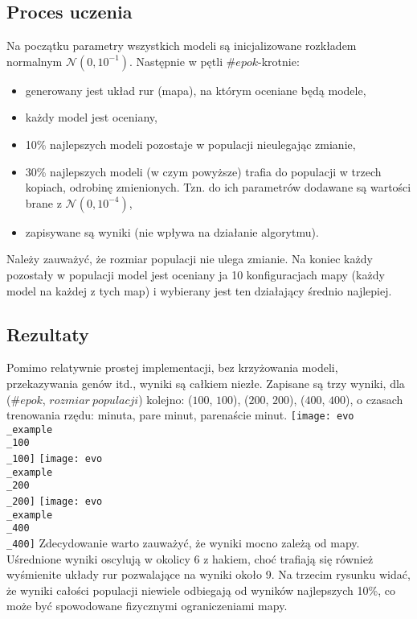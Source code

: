 \documentclass[12pt, A4]{article}
\begin{document}
\begin{itemize}
\begin{itemize}
\subsection{Proces uczenia}
Na początku parametry wszystkich modeli są inicjalizowane rozkładem normalnym $\mathcal{N}(0, 10^{-1})$.
Następnie w pętli $\#epok$-krotnie:
\begin{itemize}
	\item generowany jest układ rur (mapa), na którym oceniane będą modele,
	\item każdy model jest oceniany,
	\item 10\% najlepszych modeli pozostaje w populacji nieulegając zmianie,
	\item 30\% najlepszych modeli (w czym powyższe) trafia do populacji w trzech kopiach, odrobinę zmienionych. Tzn. do ich parametrów dodawane są wartości brane z $\mathcal{N}(0, 10^{-4})$,
	\item zapisywane są wyniki (nie wpływa na działanie algorytmu).
\end{itemize}
Należy zauważyć, że rozmiar populacji nie ulega zmianie.
\newline
Na koniec każdy pozostały w populacji model jest oceniany ja 10 konfiguracjach mapy (każdy model na każdej z tych map) i wybierany jest ten działający średnio najlepiej.

\subsection{Rezultaty}
Pomimo relatywnie prostej implementacji, bez krzyżowania modeli, przekazywania genów itd., wyniki są całkiem niezłe. Zapisane są trzy wyniki, dla ($\#epok$, $rozmiar \ populacji$) kolejno: ($100$, $100$), ($200$, $200$), ($400$, $400$), o czasach trenowania rzędu: minuta, pare minut, parenaście minut.
\newline
\texttt{[image: evo\\\_example\\\_100\\\_100]}
\texttt{[image: evo\\\_example\\\_200\\\_200]}
\newline
\texttt{[image: evo\\\_example\\\_400\\\_400]}
\newline
Zdecydowanie warto zauważyć, że wyniki mocno zależą od mapy. Uśrednione wyniki oscylują w okolicy 6 z hakiem, choć trafiają się również wyśmienite układy rur pozwalające na wyniki około 9.
\newline
Na trzecim rysunku widać, że wyniki całości populacji niewiele odbiegają od wyników najlepszych 10\%, co może być spowodowane fizycznymi ograniczeniami mapy.


\end{itemize}
\end{itemize}
\end{document}
